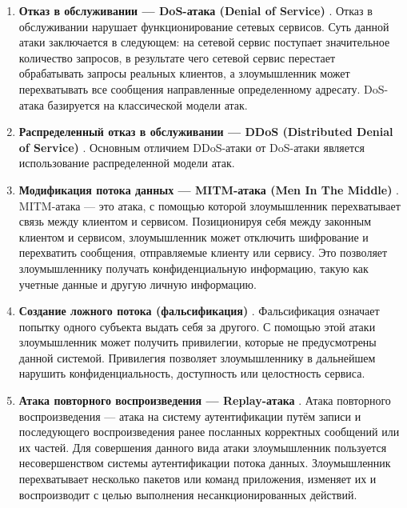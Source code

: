 \begin{enumerate}

    \item \textbf{Отказ в обслуживании --- DoS-атака (Denial of Service)} \cite{fifth}. Отказ в обслуживании нарушает функционирование сетевых сервисов. Суть данной атаки заключается в следующем: на сетевой сервис поступает значительное количество запросов, в результате чего сетевой сервис перестает обрабатывать запросы реальных клиентов, а злоумышленник может перехватывать все сообщения направленные определенному адресату. DoS-атака базируется на классической модели атак.  \clearpage  {}
    \item \textbf{Распределенный отказ в обслуживании --- DDoS (Distributed Denial of Service)} \cite{fifth}. Основным отличием DDoS-атаки от DoS-атаки является использование распределенной модели атак.
    \item \textbf{Модификация потока данных --- MITM-атака (Men In The Middle)} \cite{six}. MITM-атака --- это атака, с помощью которой злоумышленник перехватывает связь между клиентом и сервисом. Позиционируя себя между законным клиентом и сервисом, злоумышленник может отключить шифрование и перехватить сообщения, отправляемые клиенту или сервису. Это позволяет злоумышленнику получать конфиденциальную информацию, такую как учетные данные и другую личную информацию.  
    \item \textbf{Создание ложного потока (фальсификация)} \cite{seventh}. Фальсификация означает попытку одного субъекта выдать себя за другого. С помощью этой атаки злоумышленник может получить привилегии, которые не предусмотрены данной системой. Привилегия позволяет злоумышленнику в дальнейшем нарушить конфиденциальность, доступность или целостность сервиса.
    \item \textbf{Атака повторного воспроизведения --- Replay-атака} \cite{seventh}. Атака повторного воспроизведения --- атака на систему аутентификации путём записи и последующего воспроизведения ранее посланных корректных сообщений или их частей. Для совершения данного вида атаки злоумышленник пользуется несовершенством системы аутентификации потока данных. Злоумышленник перехватывает несколько пакетов или команд приложения, изменяет их и воспроизводит с целью выполнения несанкционированных действий. 
\end{enumerate}




